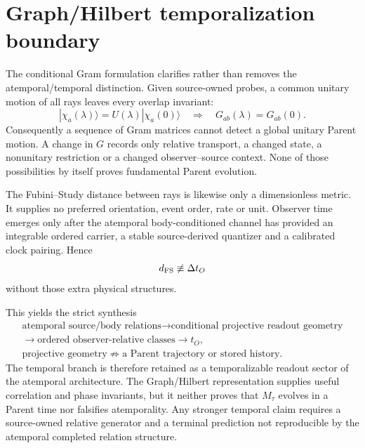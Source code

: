 \documentclass[11pt]{article}
\begin{document}
\section{Graph/Hilbert temporalization boundary}

The conditional Gram formulation clarifies rather than removes the
atemporal/temporal distinction.  Given source-owned probes, a common unitary
motion of all rays leaves every overlap invariant:
\begin{equation}
 |\chi_a(\lambda)\rangle=U(\lambda)|\chi_a(0)\rangle
 \quad\Longrightarrow\quad
 G_{ab}(\lambda)=G_{ab}(0).
 \label{eq:synthesis-common-unitary-gram}
\end{equation}
Consequently a sequence of Gram matrices cannot detect a global unitary
Parent motion.  A change in $G$ records only relative transport, a changed
state, a nonunitary restriction or a changed observer--source context.  None
of those possibilities by itself proves fundamental Parent evolution.

The Fubini--Study distance between rays is likewise only a dimensionless
metric.  It supplies no preferred orientation, event order, rate or unit.
Observer time emerges only after the atemporal body-conditioned channel has
provided an integrable ordered carrier, a stable source-derived quantizer and
a calibrated clock pairing.  Hence
\begin{equation}
 d_{\rm FS}\not\equiv\Delta t_O
 \label{eq:synthesis-fs-no-clock}
\end{equation}
without those extra physical structures.

This yields the strict synthesis
\begin{equation}
 \begin{gathered}
 \text{atemporal source/body relations}
 \longrightarrow\text{conditional projective readout geometry}\\
 \longrightarrow\text{ordered observer-relative classes}
 \longrightarrow t_O,\\
 \text{projective geometry}
 \not\Longrightarrow
 \text{a Parent trajectory or stored history}.
 \end{gathered}
 \label{eq:synthesis-gram-placement}
\end{equation}
The temporal branch is therefore retained as a temporalizable readout sector
of the atemporal architecture.  The Graph/Hilbert representation supplies
useful correlation and phase invariants, but it neither proves that
$M_\tau$ evolves in a Parent time nor falsifies atemporality.  Any stronger
temporal claim requires a source-owned relative generator and a terminal
prediction not reproducible by the atemporal completed relation structure.
\end{document}
